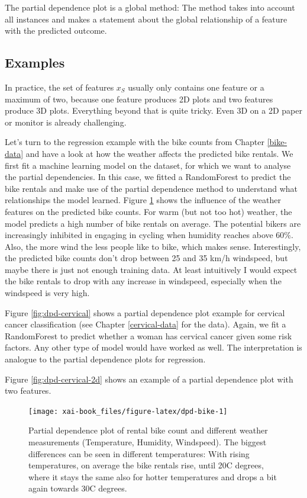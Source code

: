 \documentclass[12pt,]{krantz}
\theoremstyle{definition}
\theoremstyle{definition}
\theoremstyle{definition}
\theoremstyle{remark}
\begin{document}
The partial dependence plot is a global method: The method takes into
account all instances and makes a statement about the global
relationship of a feature with the predicted outcome.

\subsection{Examples}\label{examples}

In practice, the set of features \(x_S\) usually only contains one
feature or a maximum of two, because one feature produces 2D plots and
two features produce 3D plots. Everything beyond that is quite tricky.
Even 3D on a 2D paper or monitor is already challenging.

Let's turn to the regression example with the bike counts from Chapter
\ref{bike-data} and have a look at how the weather affects the predicted
bike rentals. We first fit a machine learning model on the dataset, for
which we want to analyse the partial dependencies. In this case, we
fitted a RandomForest to predict the bike rentals and make use of the
partial dependence method to understand what relationships the model
learned. Figure \ref{fig:dpd-bike} shows the influence of the weather
features on the predicted bike counts. For warm (but not too hot)
weather, the model predicts a high number of bike rentals on average.
The potential bikers are increasingly inhibited in engaging in cycling
when humidity reaches above 60\%. Also, the more wind the less people
like to bike, which makes sense. Interestingly, the predicted bike
counts don't drop between 25 and 35 km/h windspeed, but maybe there is
just not enough training data. At least intuitively I would expect the
bike rentals to drop with any increase in windspeed, especially when the
windspeed is very high.

Figure \ref{fig:dpd-cervical} shows a partial dependence plot example
for cervical cancer classification (see Chapter \ref{cervical-data} for
the data). Again, we fit a RandomForest to predict whether a woman has
cervical cancer given some risk factors. Any other type of model would
have worked as well. The interpretation is analogue to the partial
dependence plots for regression.

Figure \ref{fig:dpd-cervical-2d} shows an example of a partial
dependence plot with two features.

\begin{figure}

{\centering \texttt{[image: xai-book\_files/figure-latex/dpd-bike-1]} 

}

\caption{Partial dependence plot of rental bike count and different weather measurements (Temperature, Humidity, Windspeed). The biggest differences can be seen in different temperatures: With rising temperatures, on average the bike rentals rise, until 20C degrees, where it stays the same also for hotter temperatures and drops a bit again towards 30C degrees.}\label{fig:dpd-bike}
\end{figure}
\end{document}
